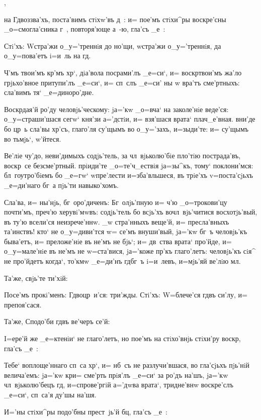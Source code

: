 ,

на Гд воззва'хъ, поста'вимъ стiхw'въ д~: и= пое'мъ 
стiхи^ры воскре'сны _о=смогла'сника г~, повторя'юще а~-ю, 
гла'съ _е~:

Стi'хъ: W\т стра'жи о_у='треннiя до но'щи, w\т стра'жи 
о_у='треннiя, да о_у=пова'етъ i=и~ль на гд.

Ч'мъ твои'мъ кр'мъ хр`, дiа'вола 
посрами'лъ _е=си`, и= воскр твои'мъ жа'ло 
грjьхо'вное притупи'лъ _е=си`, и= сп~слъ _е=си' ны w\т 
вра'тъ сме'ртныхъ: сла'вимъ тя` _е=диноро'дне.

Воскр дая'й ро'ду человjь'ческому: jа='кw _о=вча` 
на заколе'нiе веде'ся: о_у=страши'шася сегw` кня'зи 
а='дстiи, и= взя'шася врата` плач_е'вная. вни'де бо цр~ь 
сла'вы хр'съ, глаго'ля су'щымъ во о_у='захъ, 
и=зыди'те: и= су'щымъ во тьмjь`, w'йтеся.

Ве'лiе чу'до, неви'димыхъ содjь'тель, за 
чл~вjьколю'бiе пло'тiю пострада'въ, воскр~се 
безсме'ртный. прiиди'те _о=те'ч_ествiя jа=зы^къ, тому` 
поклони'мся: бл~гоутро'бiемъ бо _е=гw` w\т пре'лести 
и=зба'вльшеся, въ трiе'хъ v=поста'сjьхъ _е=ди'наго бг~а 
пjь'ти навыко'хомъ.

Сла'ва, и= ны'нjь, бг~оро'диченъ: Бг~олjь'пную и= 
ч'ю _о=трокови'цу почти'мъ, преч'ю херувi'мwвъ: 
содjь'тель бо всjь'хъ вочл~вjь'читися восхотjь'вый, въ 
ту'ю всели'ся неизрече'ннw. _w стра'нныхъ веще'й, и= 
пресла'вныхъ та'инствъ! кто` не о_у=диви'тся w= се'мъ 
внуши'вый, jа='кw бг~ъ человjь'къ быва'етъ, и= 
преложе'нiе въ не'мъ не бjь`; и= дв~ства врата` про'йде, 
и= о_у=мале'нiе въ не'мъ не w=ста'вися, jа='коже 
пр'къ глаго'летъ: человjь'къ сiя^ не про'йдетъ 
когда`, то'кмw _е=ди'нъ гд бг~ъ i=и~левъ, и=мjь'яй 
ве'лiю мл. 

Та'же, свjь'те ти'хiй:

Посе'мъ прокi'менъ: Гд воцр~и'ся: три'жды. Стi'хъ: 
W=блече'ся гд въ си'лу, и= препоя'сася. 

Та'же, Сподо'би гд въ ве'черъ се'й:

I=ере'й же _е=ктенiи` не глаго'летъ, но пое'мъ на 
стiхо'внjь стiхи'ру воскр, гла'съ _е~:

Тебе` воплоще'ннаго сп~са хр`, и= нб~съ не 
разлучи'вшася, во гла'сjьхъ пjь'нiй велича'емъ: jа='кw 
кр и= сме'рть прiя'лъ _е=си` за ро'дъ на'шъ, jа='кw 
чл~вjьколю'бецъ гд, и=спрове'ргiй а='дwва врата`, 
тридне'внw воскре'слъ _е=си`, сп~са'я ду'шы на'шя.

И='ны стiхи^ры подо'бны прест~jь'й бц, гла'съ _е~:

